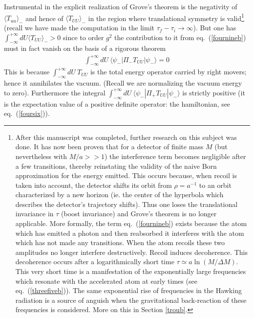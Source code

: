 \documentclass[12pt,oneside]{report}
\def\elematrice#1#2#3{\langle #1|#2|#3 \rangle}
\begin{document}
Instrumental in the explicit realization of Grove's theorem is the negativity
of $\langle T_{uu} \rangle_-$ and hence of $\langle T_{UU} \rangle_-$ in the
 region where translational symmetry is valid\footnote{
After this manuscript was completed, further research on this
subject was done. 
It has now been proven  \cite{Par} 
that for a detector of finite mass $M$ (but nevertheless
with $M/a >>1$) the interference term becomes 
negligible after a few transitions,
thereby reinstating the validity of the naive Born approximation for the energy
emitted. This occurs because, when recoil 
is taken into account, the detector shifts its
orbit from $\rho=a^{-1}$ to an orbit characterized by a new horizon (ie. 
the center of
the hyperbola which describes the detector's trajectory shifts). Thus one loses the
translational invariance in $\tau$ (boost invariance) and Grove's theorem is no longer
applicable. More formally, the term eq.~(\ref{fournineb}) exists because the
atom which has emitted a photon and then reabsorbed it interferes with the atom
which has not made any transitions. When 
the atom recoils these two amplitudes  no longer interfere destructively.
Recoil induces decoherence. This decoherence occurs
after a logarithmically short time 
$ \tau \simeq a \ln ( M / \Delta M) $. This very short time is a manifestation of the exponentially
large frequencies which resonate with the accelerated atom 
at early times (see eq.~(\ref{threefiveb})). 
The same exponential rise of frequencies in the Hawking radiation
is a source of anguish when the gravitational back-reaction of these
frequencies is considered. More on this in Section \ref{troub}.}  (recall
we have made the computation in the limit $\tau_f-\tau_i \to \infty$). But 
one has
$\int_{-\infty}^{+\infty}  dU \langle T_{UU} \rangle_- > 0$ 
since to order $g^2$ the contribution to it from eq.~(\ref{fournineb}) must in
fact vanish  on the basis of a
rigorous theorem 
\begin{eqnarray}
\int_{-\infty}^{+ \infty} \! dU \ \elematrice{\psi_-}{\Pi_-
T_{UU}}{\psi_-} =0
\label{sixnine}
\end{eqnarray}
This is because 
$\int_{-\infty}^{+ \infty} \! dU \ 
T_{UU}$
is the total energy operator carried by right movers; hence it
annihilates the vacuum. (Recall we are normalizing the vacuum energy to
zero).
Furthermore the integral 
$\int_{-\infty}^{+ \infty} \! dU \
\elematrice{\psi_-}{\Pi_+T_{UU}}{\psi_-}$ is strictly positive (it 
is the expectation value of a positive definite operator:
the hamiltonian, see eq.~(\ref{foursix})).
\end{document}
